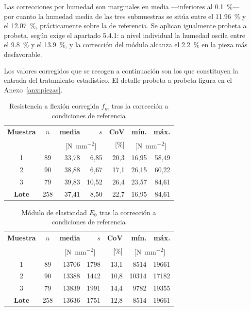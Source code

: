\documentclass[11pt,a4paper]{article}
\newcommand{\fm}{f_{m}}
\newcommand{\Ecero}{E_{0}}
\begin{document}
\medskip
\noindent Las correcciones por humedad son marginales en media ---inferiores al
\SI{0,1}{\percent}--- por cuanto la humedad media de las tres submuestras se sitúa
entre el \SI{11,96}{\percent} y el \SI{12,07}{\percent}, prácticamente sobre la de
referencia. Se aplican igualmente probeta a probeta, según exige el apartado 5.4.1: a
nivel individual la humedad oscila entre el \SI{9,8}{\percent} y el
\SI{13,9}{\percent}, y la corrección del módulo alcanza el \SI{2,2}{\percent} en la
pieza más desfavorable.

\medskip
\noindent Los valores corregidos que se recogen a continuación son los que constituyen
la entrada del tratamiento estadístico. El detalle probeta a probeta figura en el
Anexo~\ref{anx:piezas}.

\begin{table}[H]
\centering
\caption[Resistencia a flexión corregida $\fm$ tras la corrección a condiciones de referencia]{Resistencia a flexión corregida $\fm$ tras la corrección a condiciones de referencia}
\begin{tabular}{c c r r r r r}
\toprule
\textbf{Muestra} & \textbf{$n$} & \textbf{media} & \textbf{$s$} & \textbf{CoV} & \textbf{mín.} & \textbf{máx.} \\
 & & \multicolumn{2}{c}{[\si{\newton\per\square\milli\meter}]} & [\si{\percent}] & \multicolumn{2}{c}{[\si{\newton\per\square\milli\meter}]} \\
\midrule
1 & 89 & 33,78 & 6,85 & 20,3 & 16,95 & 58,49 \\
2 & 90 & 38,88 & 6,67 & 17,1 & 26,15 & 60,22 \\
3 & 79 & 39,83 & 10,52 & 26,4 & 23,57 & 84,61 \\
\textbf{Lote} & 258 & 37,41 & 8,50 & 22,7 & 16,95 & 84,61 \\
\bottomrule
\end{tabular}
\end{table}

\begin{table}[H]
\centering
\caption[Módulo de elasticidad $\Ecero$ tras la corrección a condiciones de referencia]{Módulo de elasticidad $\Ecero$ tras la corrección a condiciones de referencia}
\begin{tabular}{c c r r r r r}
\toprule
\textbf{Muestra} & \textbf{$n$} & \textbf{media} & \textbf{$s$} & \textbf{CoV} & \textbf{mín.} & \textbf{máx.} \\
 & & \multicolumn{2}{c}{[\si{\newton\per\square\milli\meter}]} & [\si{\percent}] & \multicolumn{2}{c}{[\si{\newton\per\square\milli\meter}]} \\
\midrule
1 & 89 & 13706 & 1798 & 13,1 & 8514 & 19661 \\
2 & 90 & 13388 & 1442 & 10,8 & 10314 & 17182 \\
3 & 79 & 13839 & 1991 & 14,4 & 9782 & 19355 \\
\textbf{Lote} & 258 & 13636 & 1751 & 12,8 & 8514 & 19661 \\
\bottomrule
\end{tabular}
\end{table}
\end{document}
